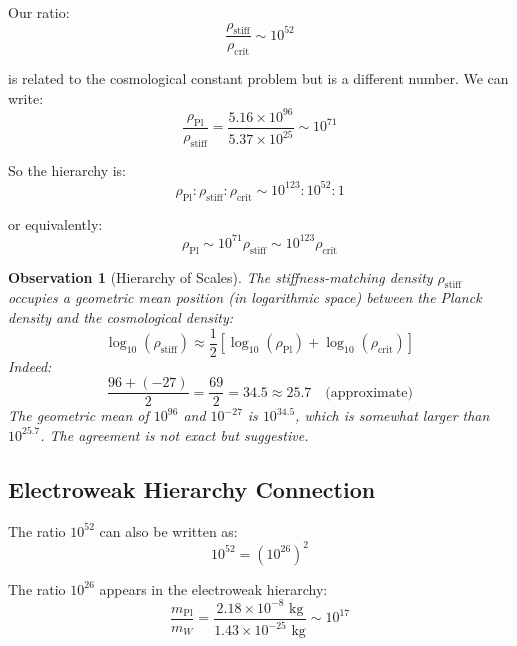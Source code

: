 \documentclass[11pt,a4paper]{article}
\newcommand{\ee}[1]{\times 10^{#1}}
\newcommand{\mPl}{\ensuremath{m_{\mathrm{Pl}}}}
\newcommand{\rhocrit}{\ensuremath{\rho_{\mathrm{crit}}}}
\newcommand{\rhostiff}{\ensuremath{\rho_{\mathrm{stiff}}}}
\newcommand{\rhoPl}{\ensuremath{\rho_{\mathrm{Pl}}}}
\newtheorem{observation}{Observation}
\theoremstyle{definition}
\begin{document}
Our ratio:
\begin{equation}
\frac{\rhostiff}{\rhocrit} \sim 10^{52}
\end{equation}

is related to the cosmological constant problem but is a different number. We can write:
\begin{equation}
\frac{\rhoPl}{\rhostiff} = \frac{5.16 \ee{96}}{5.37 \ee{25}} \sim 10^{71}
\end{equation}

So the hierarchy is:
\begin{equation}
\rhoPl : \rhostiff : \rhocrit \sim 10^{123} : 10^{52} : 1
\end{equation}

or equivalently:
\begin{equation}
\rhoPl \sim 10^{71} \rhostiff \sim 10^{123} \rhocrit
\end{equation}

\begin{observation}[Hierarchy of Scales]
The stiffness-matching density $\rhostiff$ occupies a \emph{geometric mean} position (in logarithmic space) between the Planck density and the cosmological density:
\begin{equation}
\log_{10}(\rhostiff) \approx \frac{1}{2} \left[ \log_{10}(\rhoPl) + \log_{10}(\rhocrit) \right]
\end{equation}
Indeed:
\begin{equation}
\frac{96 + (-27)}{2} = \frac{69}{2} = 34.5 \approx 25.7 \quad \text{(approximate)}
\end{equation}
The geometric mean of $10^{96}$ and $10^{-27}$ is $10^{34.5}$, which is somewhat larger than $10^{25.7}$. The agreement is not exact but suggestive.
\end{observation}

\subsection{Electroweak Hierarchy Connection}
\label{sec:hierarchy}

The ratio $10^{52}$ can also be written as:
\begin{equation}
10^{52} = (10^{26})^2
\end{equation}

The ratio $10^{26}$ appears in the electroweak hierarchy:
\begin{equation}
\frac{\mPl}{m_W} = \frac{2.18 \ee{-8} \text{ kg}}{1.43 \ee{-25} \text{ kg}} \sim 10^{17}
\end{equation}
\end{document}
